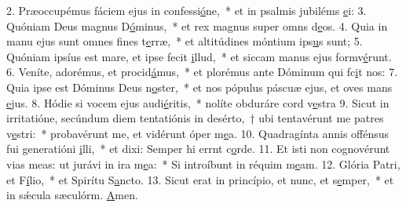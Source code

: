 2. Præoccupémus fáciem ejus in confessi\uline{ó}ne,~* et in psalmis jubiléms \uline{e}i:
3. Quóniam Deus magnus D\uline{ó}minus,~* et rex magnus super omns d\uline{e}os.
4. Quia in manu ejus sunt omnes fines t\uline{e}rræ,~* et altitúdines móntium ips\uline{u}s sunt;
5. Quóniam ipsíus est mare, et ipse fecit \uline{i}llud,~* et siccam manus ejus formv\uline{é}runt.
6. Veníte, adorémus, et procid\uline{á}mus,~* et plorémus ante Dóminum qui fc\uline{i}t nos:
7. Quia ipse est Dóminus Deus n\uline{o}ster,~* et nos pópulus páscuæ ejus, et oves mans \uline{e}jus.
8. Hódie si vocem ejus audi\uline{é}ritis,~* nolíte obduráre cord v\uline{e}stra
9. Sicut in irritatióne, secúndum diem tentatiónis in desérto,~† ubi tentavérunt me patres v\uline{e}stri:~* probavérunt me, et vidérunt óper m\uline{e}a.
10. Quadragínta annis offénsus fui generatióni \uline{i}lli,~* et dixi: Semper hi errnt c\uline{o}rde.
11. Et isti non cognovérunt vias meas: ut jurávi in ira m\uline{e}a:~* Si introíbunt in réquim m\uline{e}am.
12. Glória Patri, et F\uline{í}lio,~* et Spirítu S\uline{a}ncto.
13. Sicut erat in princípio, et nunc, et s\uline{e}mper,~* et in sǽcula sæculórm. \uline{A}men.
